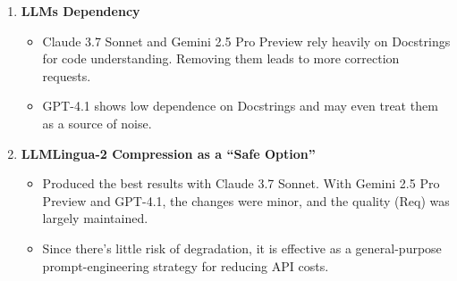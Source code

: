 \begin{enumerate}
    \item \textbf{LLMs Dependency}
        \begin{itemize}[label={$\bullet$}]
            \item Claude 3.7 Sonnet and Gemini 2.5 Pro Preview rely heavily on Docstrings for code understanding. Removing them leads to more correction requests.
            \vspace{0.2cm}
            
            \item GPT-4.1 shows low dependence on Docstrings and may even treat them as a source of noise.
        \end{itemize}
\vspace{0.3cm}

    \item \textbf{LLMLingua-2 Compression as a “Safe Option”}
        \begin{itemize}[label={$\bullet$}]
            \item Produced the best results with Claude 3.7 Sonnet. With Gemini 2.5 Pro Preview and GPT-4.1, the changes were minor, and the quality (Req) was largely maintained.
            \vspace{0.2cm}
            
            \item Since there’s little risk of degradation, it is effective as a general-purpose prompt-engineering strategy for reducing API costs.
        \end{itemize}
\end{enumerate}

